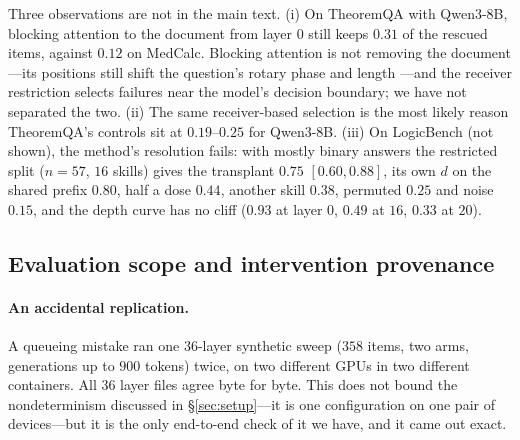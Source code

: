 \documentclass{article}
\newcommand{\dvec}{\ensuremath{d}}
\begin{document}
Three observations are not in the main text. (i) On TheoremQA with Qwen3-8B,
blocking attention to the document from layer $0$ still keeps $0.31$ of the
rescued items, against $0.12$ on MedCalc. Blocking attention is not removing
the document---its positions still shift the question's rotary phase and length
---and the receiver restriction selects failures near the model's decision
boundary; we have not separated the two. (ii) The same receiver-based selection is the
most likely reason TheoremQA's controls sit at $0.19$--$0.25$ for Qwen3-8B. (iii)
On LogicBench (not shown), the method's resolution fails: with mostly binary
answers the restricted split ($n=57$, $16$ skills) gives the transplant $0.75$
$[0.60, 0.88]$, its own $\dvec$ on the shared prefix $0.80$, half a dose $0.44$, another skill
$0.38$, permuted $0.25$ and noise $0.15$, and the depth curve has no cliff
($0.93$ at layer $0$, $0.49$ at $16$, $0.33$ at $20$).

\subsection{Evaluation scope and intervention provenance}
\label{app:limits}

\paragraph{An accidental replication.} A queueing mistake ran one $36$-layer
synthetic sweep ($358$ items, two arms, generations up to $900$ tokens) twice,
on two different GPUs in two different containers. All $36$ layer files agree
byte for byte. This does not bound the nondeterminism discussed in
\S\ref{sec:setup}---it is one configuration on one pair of devices---but it is
the only end-to-end check of it we have, and it came out exact.
\end{document}
